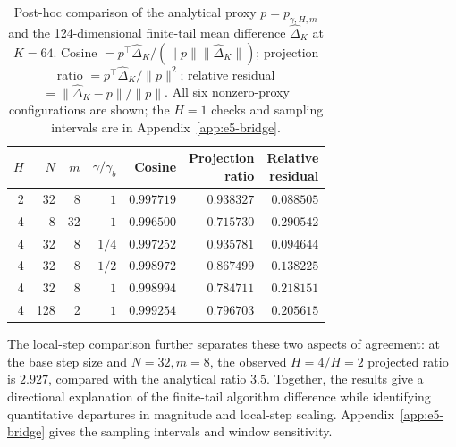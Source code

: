 \begin{table}[!htbp]
\centering\small
\setlength{\tabcolsep}{5pt}
\caption{Post-hoc comparison of the analytical proxy $p=p_{\gamma,H,m}$
and the 124-dimensional finite-tail mean difference $\widehat\Delta_K$
at $K=64$. Cosine $=p^\top\widehat\Delta_K/(\|p\|\|\widehat\Delta_K\|)$;
projection ratio $=p^\top\widehat\Delta_K/\|p\|^2$;
relative residual $=\|\widehat\Delta_K-p\|/\|p\|$.
All six nonzero-proxy configurations are shown; the $H=1$ checks and
sampling intervals are in Appendix~\ref{app:e5-bridge}.}
\label{tab:e5-bridge}
\begin{tabular}{@{}rrrrrrr@{}}
\toprule
$H$ & $N$ & $m$ & $\gamma/\gamma_b$ & Cosine & \shortstack{Projection\\ratio} & \shortstack{Relative\\residual} \\
\midrule
2 & 32 & 8 & $1$ & $0.997719$ & $0.938327$ & $0.088505$ \\
4 & 8 & 32 & $1$ & $0.996500$ & $0.715730$ & $0.290542$ \\
4 & 32 & 8 & $1/4$ & $0.997252$ & $0.935781$ & $0.094644$ \\
4 & 32 & 8 & $1/2$ & $0.998972$ & $0.867499$ & $0.138225$ \\
4 & 32 & 8 & $1$ & $0.998994$ & $0.784711$ & $0.218151$ \\
4 & 128 & 2 & $1$ & $0.999254$ & $0.796703$ & $0.205615$ \\
\bottomrule
\end{tabular}
\end{table}

The local-step comparison further separates these two aspects of agreement:
at the base step size and $N=32,m=8$, the observed $H=4/H=2$ projected
ratio is $2.927$, compared with the analytical ratio $3.5$.
Together, the results give a directional explanation of the finite-tail
algorithm difference while identifying quantitative departures in magnitude
and local-step scaling. Appendix~\ref{app:e5-bridge} gives the sampling
intervals and window sensitivity.

